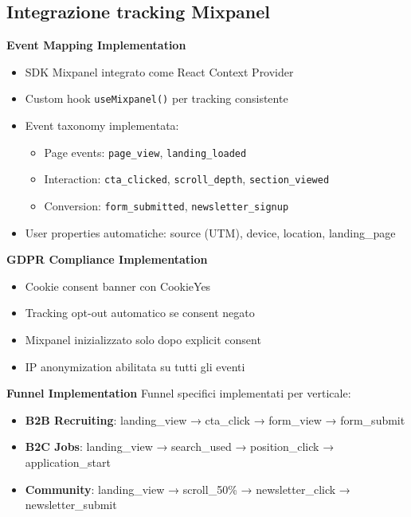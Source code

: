 \subsection{Integrazione tracking Mixpanel}
\textbf{Event Mapping Implementation}
\begin{itemize}
  \item SDK Mixpanel integrato come React Context Provider
  \item Custom hook \texttt{useMixpanel()} per tracking consistente
  \item Event taxonomy implementata:
    \begin{itemize}
      \item Page events: \texttt{page\_view}, \texttt{landing\_loaded}
      \item Interaction: \texttt{cta\_clicked}, \texttt{scroll\_depth}, 
            \texttt{section\_viewed}
      \item Conversion: \texttt{form\_submitted}, 
            \texttt{newsletter\_signup}
    \end{itemize}
  \item User properties automatiche: source (UTM), device, location, 
        landing\_page
\end{itemize}

\textbf{GDPR Compliance Implementation}
\begin{itemize}
  \item Cookie consent banner con CookieYes
  \item Tracking opt-out automatico se consent negato
  \item Mixpanel inizializzato solo dopo explicit consent
  \item IP anonymization abilitata su tutti gli eventi
\end{itemize}

\textbf{Funnel Implementation}
Funnel specifici implementati per verticale:
\begin{itemize}
  \item \textbf{B2B Recruiting}: landing\_view → cta\_click → 
        form\_view → form\_submit
  \item \textbf{B2C Jobs}: landing\_view → search\_used → 
        position\_click → application\_start
  \item \textbf{Community}: landing\_view → scroll\_50\% → 
        newsletter\_click → newsletter\_submit
\end{itemize}


